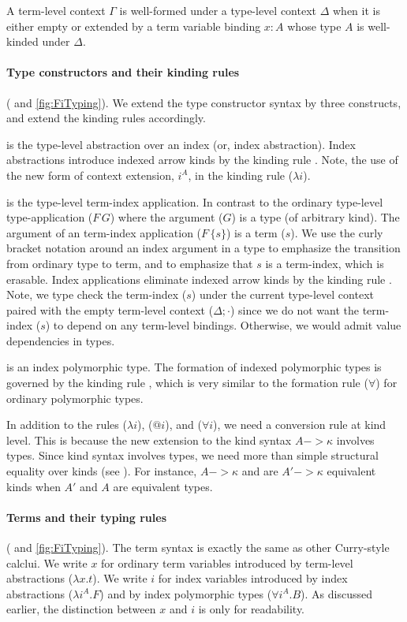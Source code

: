 A term-level context $\Gamma$ is well-formed under a type-level context
$\Delta$ when it is either empty or extended by a term variable binding
$x:A$ whose type $A$ is well-kinded under $\Delta$.

\paragraph{Type constructors and their kinding rules\!}( and \ref{fig:FiTyping}).\;
We extend the type constructor syntax by three constructs,
and extend the kinding rules accordingly.

 is the type-level abstraction over an index
(or, index abstraction). Index abstractions introduce indexed arrow kinds
by the kinding rule . Note, the use of the new form of
context extension, $i^A$, in the kinding rule ($\lambda i$).

 is the type-level term-index application. In contrast to
the ordinary type-level type-application ($F\,G$) where the argument ($G$) is
a type (of arbitrary kind). The argument of an term-index application ($F\,\{s\}$) is
a term ($s$). We use the curly bracket notation around an index argument
in a type to emphasize the transition from ordinary type to term, and
to emphasize that $s$ is a term-index, which is erasable. Index applications
eliminate indexed arrow kinds by the kinding rule .
Note, we type check
the term-index ($s$) under the current type-level context paired with
the empty term-level context ($\Delta;\cdot$) since we do not want
the term-index ($s$) to depend on any term-level bindings.
Otherwise, we would admit value dependencies in types.

 is an index polymorphic type.
The formation of indexed polymorphic types is governed by
the kinding rule , which is very similar to
the formation rule ($\forall$) for ordinary polymorphic types.

In addition to the rules ($\lambda i$), ($@ i$), and ($\forall i$),
we need a conversion rule  at kind level. This is because
the new extension to the kind syntax $A -> \kappa$ involves types.
Since kind syntax involves types, we need more than simple structural
equality over kinds (see ). For instance, $A -> \kappa$ and 
are $A' -> \kappa$ equivalent kinds when $A'$ and $A$ are equivalent types.

\paragraph{Terms and their typing rules}( and \ref{fig:FiTyping}).\;
The term syntax is exactly the same as other Curry-style calclui.
We write $x$ for ordinary term variables introduced by
term-level abstractions ($\lambda x.t$).
We write $i$ for index variables introduced by
index abstractions ($\lambda i^A.F$) and by
index polymorphic types ($\forall i^A.B$). As discussed earlier,
the distinction between $x$ and $i$ is only for readability.

